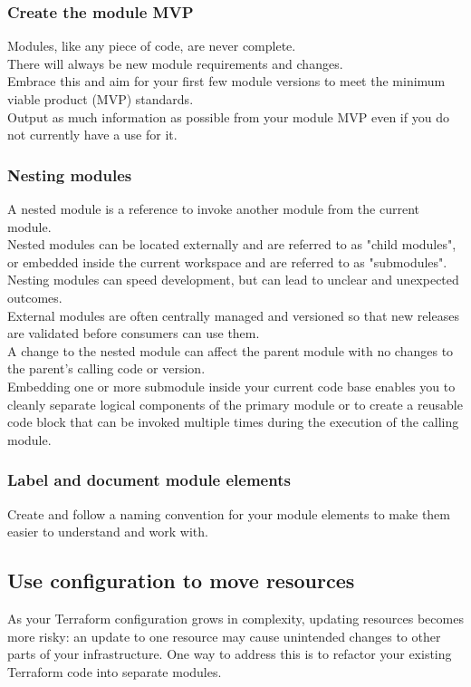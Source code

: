 \documentclass[12pt, letterpaper, twoside]{article}
\begin{document}
\subsubsection{Create the module MVP}
Modules, like any piece of code, are never complete.\\
There will always be new module requirements and changes.\\
Embrace this and aim for your first few module versions to meet the minimum viable 
product (MVP) standards.\\
Output as much information as possible from your module MVP even if you do not currently 
have a use for it.

\subsubsection{Nesting modules}
A nested module is a reference to invoke another module from the current module.\\
Nested modules can be located externally and are referred to as "child modules", 
or embedded inside the current workspace and are referred to as "submodules".\\
Nesting modules can speed development, but can lead to unclear and unexpected outcomes.\\

External modules are often centrally managed and versioned so that new releases are 
validated before consumers can use them.\\
A change to the nested module can affect the parent module with no changes to the 
parent's calling code or version.\\

Embedding one or more submodule inside your current code base enables you to cleanly 
separate logical components of the primary module or to create a reusable code block that 
can be invoked multiple times during the execution of the calling module.\\

\subsubsection{Label and document module elements}
Create and follow a naming convention for your module elements to make them easier to 
understand and work with.\\

\subsection{Use configuration to move resources}
As your Terraform configuration grows in complexity, updating resources becomes more 
risky: an update to one resource may cause unintended changes to other parts of your 
infrastructure. One way to address this is to refactor your existing Terraform code 
into separate modules.\\
\end{document}
